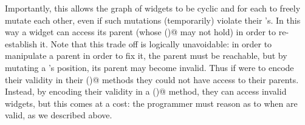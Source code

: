 Importantly, this allows the graph of widgets to be cyclic and for each to freely mutate each
other, even if such mutations (temporarily) violate their \Q@subInvariant@'s.
In this way a widget can access its parent (whose \Q@subInvariant()@ may not hold) in order to re-establish it.
Note that this trade off is logically unavoidable:
in order to manipulate a parent in order to fix it, the parent must be reachable, but
by mutating a \Q@Widget@'s position, its parent may become invalid.
Thus if \Q@Widget@s were to encode their validity in their \Q@invariant()@ methods they could not have access to their parents.
Instead, by encoding their validity in a \Q@subInvariant()@ method,
they can access invalid widgets, but this comes at a cost: the programmer must
reason as to when \Q@Widgets@ are valid, as we described above.


